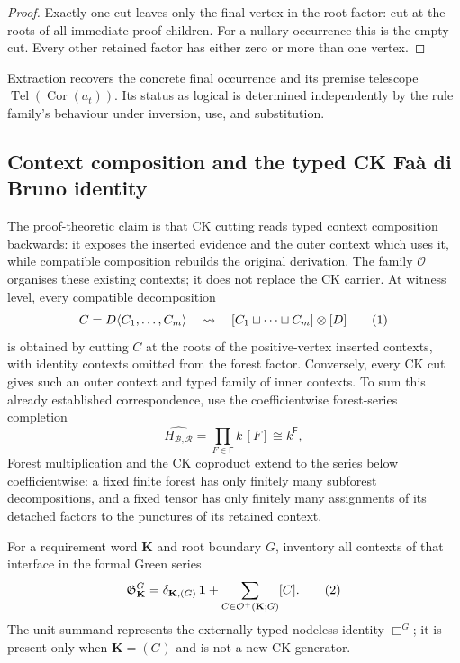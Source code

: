 \documentclass[10pt,a4paper]{article}
\theoremstyle{plain}
\theoremstyle{definition}
\theoremstyle{remark}
\newcommand{\Base}{\mathcal B}
\newcommand{\Rules}{\mathcal R}
\newcommand{\Forests}{\mathsf F}
\newcommand{\Hlic}{H_{\Base,\Rules}}
\newcommand{\fjoin}{\mathbin{\sqcup}}
\newcommand{\one}{\mathbf 1}
\newcommand{\Tel}{\operatorname{Tel}}
\newcommand{\eqtag}{\refstepcounter{equation}\tag{\theequation}}
\begin{document}
\begin{proof}
Exactly one cut leaves only the final vertex in the root factor: cut at the
roots of all immediate proof children.  For a nullary occurrence this is the empty
cut.  Every other retained factor has either zero or more than one vertex.
\end{proof}

Extraction recovers the concrete final occurrence and its premise
telescope \(\Tel(\operatorname{Cor}(a_t))\).  Its status as logical is determined independently by the
rule family's behaviour under inversion, use, and substitution.

\subsection{Context composition and the typed CK Fa\`a di Bruno identity}
\label{subsec:faa}

The proof-theoretic claim is that CK cutting reads typed context
composition backwards: it exposes the inserted evidence and the outer
context which uses it, while compatible composition rebuilds the original
derivation.  The family \(\mathcal O\) organises these existing contexts;
it does not replace the CK carrier.  At witness level, every compatible
decomposition
\[
 C=D\langle C_1,\ldots,C_m\rangle
 \quad\leadsto\quad
 [C_1\fjoin\cdots\fjoin C_m]\otimes[D]
\eqtag\label{eq:context-composition-to-ck-tensor}
\]
is obtained by cutting \(C\) at the roots of the positive-vertex inserted
contexts, with identity contexts omitted from the forest factor.
Conversely, every CK cut gives such an outer context and typed family
of inner contexts.  To sum this already established correspondence, use
the coefficientwise forest-series completion
\[
 \widehat{\Hlic}=\prod_{F\in\Forests}k\,[F]\cong k^{\Forests},
\]
Forest multiplication and the CK coproduct extend to the series below
coefficientwise: a fixed finite forest has only finitely many subforest
decompositions, and a fixed tensor has only finitely many assignments of
its detached factors to the punctures of its retained context.

For a requirement word \(\mathbf K\) and root boundary \(G\), inventory
all contexts of that interface in the formal Green series
\[
 \mathfrak G^G_{\mathbf K}
   =
   \delta_{\mathbf K,(G)}\,\one+
   \sum_{C\in\mathcal O^+(\mathbf K;G)}[C].
\eqtag\label{eq:typed-context-green-series}
\]
The unit summand represents the externally typed nodeless identity
\(\Box^G\); it is present only when \(\mathbf K=(G)\) and is not a new CK
generator.
\end{document}
